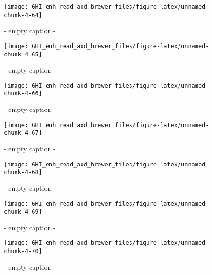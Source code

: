 \documentclass[
  10pt,
  a4paper,oneside]{article}
\begin{document}
\begin{figure}[H]

{\centering \texttt{[image: GHI\_enh\_read\_aod\_brewer\_files/figure-latex/unnamed-chunk-4-64]} 

}

\caption{ - empty caption - }\label{fig:unnamed-chunk-4-64}
\end{figure}
\begin{figure}[H]

{\centering \texttt{[image: GHI\_enh\_read\_aod\_brewer\_files/figure-latex/unnamed-chunk-4-65]} 

}

\caption{ - empty caption - }\label{fig:unnamed-chunk-4-65}
\end{figure}
\begin{figure}[H]

{\centering \texttt{[image: GHI\_enh\_read\_aod\_brewer\_files/figure-latex/unnamed-chunk-4-66]} 

}

\caption{ - empty caption - }\label{fig:unnamed-chunk-4-66}
\end{figure}
\begin{figure}[H]

{\centering \texttt{[image: GHI\_enh\_read\_aod\_brewer\_files/figure-latex/unnamed-chunk-4-67]} 

}

\caption{ - empty caption - }\label{fig:unnamed-chunk-4-67}
\end{figure}
\begin{figure}[H]

{\centering \texttt{[image: GHI\_enh\_read\_aod\_brewer\_files/figure-latex/unnamed-chunk-4-68]} 

}

\caption{ - empty caption - }\label{fig:unnamed-chunk-4-68}
\end{figure}
\begin{figure}[H]

{\centering \texttt{[image: GHI\_enh\_read\_aod\_brewer\_files/figure-latex/unnamed-chunk-4-69]} 

}

\caption{ - empty caption - }\label{fig:unnamed-chunk-4-69}
\end{figure}
\begin{figure}[H]

{\centering \texttt{[image: GHI\_enh\_read\_aod\_brewer\_files/figure-latex/unnamed-chunk-4-70]} 

}

\caption{ - empty caption - }\label{fig:unnamed-chunk-4-70}
\end{figure}
\end{document}
